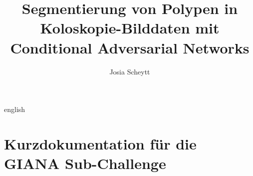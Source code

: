 

\title{Segmentierung von Polypen in Koloskopie-Bilddaten mit Conditional Adversarial Networks}
\author{Josia Scheytt}






\tableofcontents

\clearpage
{}
\begin{abstract}
	
\end{abstract}

\clearpage
{}
\begin{otherlanguage*}{english}
\begin{abstract}
	
\end{abstract}
\end{otherlanguage*}









\listoffigures
\listoftables
\printglossary[type=\acronymtype,title={Abkürzungsverzeichnis}]
\printbibliography[heading=bibintoc]

\appendix
\chapter{Kurzdokumentation für die GIANA Sub-Challenge}





